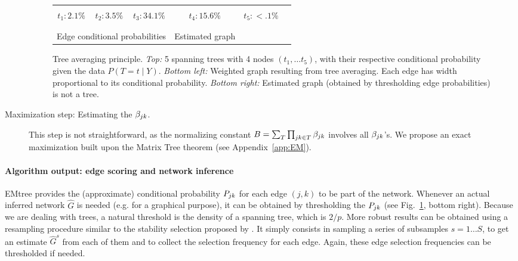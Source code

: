\begin{description}
\begin{figure}%
   \begin{center}
    \begin{tabular}{cccccc}
         &
         &
         &
         &
         \\
        $t_1: 2.1\%$ & 
        $t_2: 3.5\%$ & 
        $t_3: 34.1\%$ & 
        $t_4: 15.6\%$ & 
        $t_5:  <.1\%$ \\ \\
        & 
         &
        \qquad \qquad &
         \\
        \multicolumn{3}{c}{Edge conditional probabilities} & Estimated graph \\
    \end{tabular}
    \caption{Tree averaging principle. 
    \textit{Top:} 5 spanning trees with 4 nodes  $(t_1, \dots t_5)$, with their respective conditional probability given the data $P(T = t \mid Y)$.
    \textit{Bottom left:} Weighted graph resulting from tree averaging. Each edge  has width proportional to its conditional probability. \textit{ Bottom right:} Estimated graph (obtained by thresholding edge probabilities) is not a tree.}
    \label{fig:treeaveraging}
   \end{center}
\end{figure}

\item[Maximization step: Estimating the $\beta_{jk}$.] 
This step is not straightforward, as the normalizing constant $B = \sum_T \prod_{jk \in T} \beta_{jk}$ involves all $\beta_{jk}$'s. We propose an exact maximization built upon the Matrix Tree theorem (see Appendix~\ref{app:EM}). 
\end{description}


\paragraph{Algorithm output: edge scoring and network inference} 
EMtree provides the (approximate) conditional probability $P_{jk}$ for each edge $(j, k)$ to be part of the network. 
Whenever an actual inferred network $\widehat{G}$ is needed (e.g. for a graphical purpose), it can be obtained by thresholding the $P_{jk}$ (see Fig.~\ref{fig:treeaveraging}, bottom right). Because we are dealing with trees, a natural threshold is the density of a spanning tree, which is  $2/p$.
More robust results can be obtained using a resampling procedure similar to the stability selection proposed by \citet{LRW10}. It simply consists in sampling a series of subsamples $s = 1 \dots S$, to get an estimate $\widehat{G}^s$ from each of them and to collect the selection frequency for each edge. Again, these edge selection frequencies can be thresholded if needed.